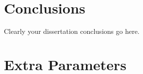 \documentclass[12pt]{report}
\begin{document}
\chapter{Conclusions}
\label{chapter:dissconclusion}
Clearly your dissertation conclusions go here. 


\appendix %

\chapter{Extra Parameters}\label{appendixextraparams}
% 





\end{document}
